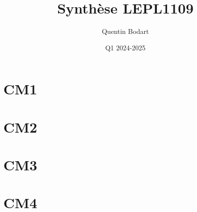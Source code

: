 \documentclass{article}
\title{Synthèse LEPL1109}
\author{Quentin Bodart}
\date{Q1 2024-2025}
\begin{document}
\maketitle
\tableofcontents
\pagebreak

\section{CM1}
\pagebreak
\section{CM2}
\pagebreak
\section{CM3}
\pagebreak
\section{CM4}
\end{document}
